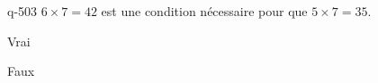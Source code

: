 \begin{truefalse}{q-503}
$6\times 7 = 42 $ est une condition nécessaire pour que $5\times 7 = 35$.
\item* Vrai
\item Faux
\end{truefalse}

